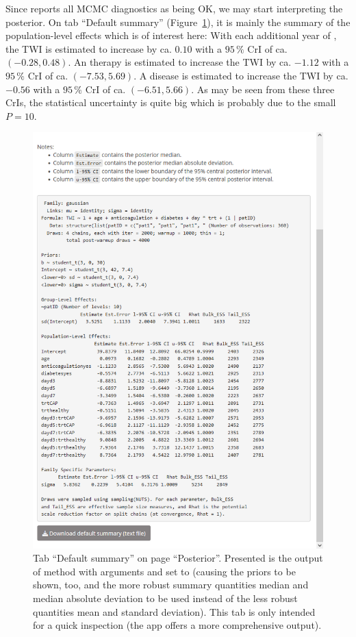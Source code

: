 Since  reports all MCMC diagnostics as being OK, we may start
interpreting the posterior. On tab ``Default summary''
(Figure~\ref{fig:post-smmry}), it is mainly the summary of the population-level
effects which is of interest here: With each additional year of , the
TWI is estimated to increase by ca. $0.10$ with a $95\,\%$ CrI of ca.
$(-0.28, 0.48)$. An  therapy is estimated
to increase the TWI by ca. $-1.12$ with a $95\,\%$ CrI of ca.
$(-7.53, 5.69)$. A  disease is estimated to increase the TWI by
ca. $-0.56$ with a $95\,\%$ CrI of ca. $(-6.51, 5.66)$. As may be
seen from these three CrIs, the statistical uncertainty is
quite big which is probably due to the small~$P = 10$.
\begin{figure}[t!]
  \centering
  \includegraphics[width=\textwidth]{Figures/Posterior_Summary.png}
  \caption[Tab ``Default summary'']{Tab ``Default summary'' on page ``Posterior''.
  Presented is the output of method  with arguments
   and  set to  (causing the priors to be
  shown, too, and the more robust summary quantities median and
  median absolute deviation to be used instead of the less robust quantities
  mean and standard deviation).
  This tab is only intended for a quick inspection (the  app
  offers a more comprehensive output).}
  \label{fig:post-smmry}
\end{figure}%

